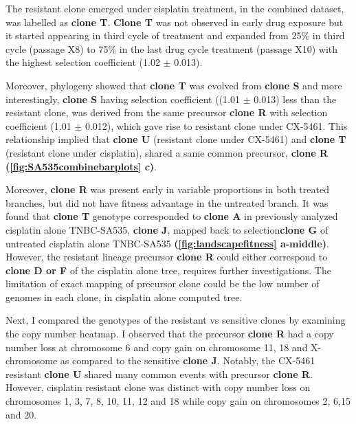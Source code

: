 
The resistant clone emerged under cisplatin treatment, in the combined dataset, was labelled as \textbf{clone T}. \textbf{Clone T} was not observed in early drug exposure but it started appearing in third cycle of treatment and expanded from 25\% in third cycle (passage X8) to 75\% in the last drug cycle treatment (passage X10) with the highest selection coefficient (1.02 $\pm$ 0.013). 

Moreover, phylogeny showed that \textbf{clone T} was evolved from \textbf{clone S} and more interestingly, \textbf{clone S} having selection coefficient ((1.01 $\pm$ 0.013) less than the resistant clone, was derived from the same precursor \textbf{clone R} with selection coefficient (1.01 $\pm$ 0.012), which gave rise to resistant clone under CX-5461. This relationship implied that \textbf{clone U} (resistant clone under CX-5461) and \textbf{clone T} (resistant clone under cisplatin), shared a same common precursor, \textbf{clone R} \textbf{(\autoref{fig:SA535combinebarplots} c)}. 

Moreover, \textbf{clone R} was present early in variable proportions in both treated branches, but did not have fitness advantage in the untreated branch. It was found that \textbf{clone T} genotype corresponded to \textbf{clone A}  in previously analyzed cisplatin alone TNBC-SA535, \textbf{clone J}, mapped back to selection\textbf{clone G} of untreated cisplatin alone TNBC-SA535 \textbf{(\autoref{fig:landscapefitness} a-middle)}. However, the resistant lineage precursor \textbf{clone R} could either correspond to \textbf{clone D or F} of the cisplatin alone tree, requires further investigations. The limitation of exact mapping of precursor clone could be the low number of genomes in each clone, in cisplatin alone computed tree.


Next, I compared the genotypes of the resistant vs sensitive clones by examining the copy number heatmap. I observed that the precursor \textbf{clone R} had a copy number loss at chromosome 6 and copy gain on chromosome 11, 18 and X-chromosome as compared to the sensitive \textbf{clone J}. Notably, the CX-5461 resistant \textbf{clone U} shared many common events with precursor \textbf{clone R}. However, cisplatin resistant clone was distinct with copy number loss on chromosomes 1, 3, 7, 8, 10, 11, 12 and 18 while copy gain on chromosomes 2, 6,15 and 20.


